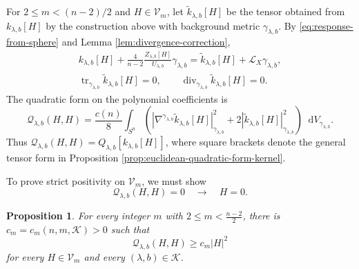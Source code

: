 \documentclass[11pt]{article}
\numberwithin{equation}{section}
\newtheorem{proposition}[theorem]{Proposition}
\theoremstyle{remark}
\newcommand{\Sph}{S}
\newcommand{\dd}{\mathop{}\!\mathrm{d}}
\DeclareMathOperator{\tr}{tr}
\DeclareMathOperator{\diver}{div}
\begin{document}
For \(2\le m<(n-2)/2\) and \(H\in\mathcal V_m\), let
\(\widetilde k_{\lambda,b}[H]\) be the tensor obtained from
\(k_{\lambda,b}[H]\) by the construction above with background metric
\(\gamma_{\lambda,b}\).
By \eqref{eq:response-from-sphere} and
Lemma  \ref{lem:divergence-correction},
\[
 \begin{gathered}
 k_{\lambda,b}[H]
 +\frac4{n-2}\frac{Z_{\lambda,b}[H]}{U_{\lambda,b}}\gamma_{\lambda,b}
 =\widetilde k_{\lambda,b}[H]+\mathcal L_X\gamma_{\lambda,b},\\
 \tr_{\gamma_{\lambda,b}}\widetilde k_{\lambda,b}[H]=0,\qquad
 \diver_{\gamma_{\lambda,b}}\widetilde k_{\lambda,b}[H]=0.
 \end{gathered}
\]
The quadratic form on the polynomial coefficients is
\begin{equation}\label{eq:metric-quadratic-form}
 \mathcal Q_{\lambda,b}(H,H)
 =\frac{c(n)}8\int_{\Sph^n}
 \left(
 |\nabla^{\gamma_{\lambda,b}}\widetilde k_{\lambda,b}[H]|_{\gamma_{\lambda,b}}^2
 +2|\widetilde k_{\lambda,b}[H]|_{\gamma_{\lambda,b}}^2
 \right)\dd V_{\gamma_{\lambda,b}}.
\end{equation}
Thus
 \(\mathcal Q_{\lambda,b}(H,H)
= Q_{\lambda,b}[k_{\lambda,b}[H]]\), where square brackets
denote the general tensor form in
Proposition  \ref{prop:euclidean-quadratic-form-kernel}.

To prove strict positivity on \(\mathcal V_m\), we must show
\[
 \mathcal Q_{\lambda,b}(H,H)=0\quad\to\quad H=0.
\]
\begin{proposition}\label{prop:euclidean-strict-positivity}
For every integer \(m\) with \(2\le m<\frac{n-2}{2}\), there is
\(c_m=c_m(n,m,\mathcal K)>0\) such that
\begin{equation}\label{eq:metric-quadratic-lower-bound}
 \mathcal Q_{\lambda,b}(H,H)
 \ge c_m|H|^2
\end{equation}
for every \(H\in\mathcal V_m\) and every
\((\lambda,b)\in\mathcal K\).
\end{proposition}
\end{document}
